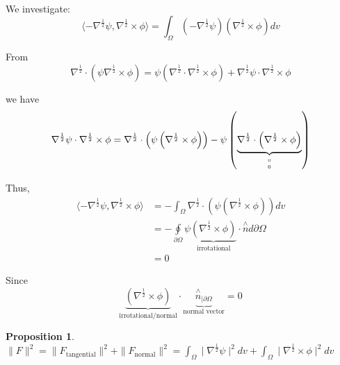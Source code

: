 \documentclass{amsart}%
\theoremstyle{plain}
\newtheorem{proposition}{Proposition}
\numberwithin{equation}{section}
\begin{document}
\ 

We investigate:
\[
\langle-\nabla^{\frac{1}{2}}\psi,\nabla^{\frac{1}{2}}\times\phi\rangle
=\int_{\Omega}\left(  -\nabla^{\frac{1}{2}}\psi\right)  \left(  \nabla
^{\frac{1}{2}}\times\phi\right)  dv
\]


From
\[
\nabla^{\frac{1}{2}}\cdot\left(  \psi\nabla^{\frac{1}{2}}\times\phi\right)
=\psi\left(  \nabla^{\frac{1}{2}}\cdot\nabla^{\frac{1}{2}}\times\phi\right)
+\nabla^{\frac{1}{2}}\psi\cdot\nabla^{\frac{1}{2}}\times\phi
\]


we have%
\[
\nabla^{\frac{1}{2}}\psi\cdot\nabla^{\frac{1}{2}}\times\phi=\nabla^{\frac
{1}{2}}\cdot\left(  \psi\left(  \nabla^{\frac{1}{2}}\times\phi\right)
\right)  -\psi\left(  \underset{\underset{0}{\shortparallel}%
}{\underbrace{\nabla^{\frac{1}{2}}\cdot\left(  \nabla^{\frac{1}{2}}\times
\phi\right)  }}\right)
\]


Thus, $\ $%
\begin{align*}
\langle-\nabla^{\frac{1}{2}}\psi,\nabla^{\frac{1}{2}}\times\phi\rangle &
=-\int_{\Omega}\nabla^{\frac{1}{2}}\cdot\left(  \psi\left(  \nabla^{\frac
{1}{2}}\times\phi\right)  \right)  dv\\
& =-%
{\displaystyle\oint\limits_{\partial\Omega}}
\psi\underset{\text{irrotational}}{\underbrace{\left(  \nabla^{\frac{1}{2}%
}\times\phi\right)  }}\cdot\overset{\wedge}{n}d\partial\Omega\\
& =0
\end{align*}


Since
\[
\underset{\text{irrotational/normal}}{\underbrace{\left(  \nabla^{\frac{1}{2}%
}\times\phi\right)  }}\cdot\underset{\text{normal vector}%
}{\underbrace{\overset{\wedge}{n}_{\mid\partial\Omega}}}=0
\]


\begin{proposition}
$\parallel F\parallel^{2}=\parallel F_{\text{tangential}}\parallel
^{2}+\parallel F_{\text{normal}}\parallel^{2}=\int_{\Omega}\mid\nabla
^{\frac{1}{2}}\psi\mid^{2}dv+\int_{\Omega}\mid\nabla^{\frac{1}{2}}\times
\phi\mid^{2}dv$
\end{proposition}
\end{document}
